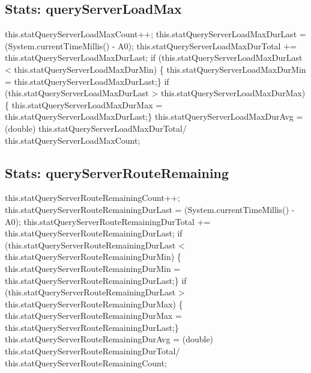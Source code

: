 \subsection{Stats: queryServerLoadMax}
\nwenddocs{}\endmoddef{}
    this.statQueryServerLoadMaxCount++;
    this.statQueryServerLoadMaxDurLast = (System.currentTimeMillis() - A0);
    this.statQueryServerLoadMaxDurTotal +=
    this.statQueryServerLoadMaxDurLast;
if (this.statQueryServerLoadMaxDurLast <
    this.statQueryServerLoadMaxDurMin) \{
    this.statQueryServerLoadMaxDurMin =
    this.statQueryServerLoadMaxDurLast;\}
if (this.statQueryServerLoadMaxDurLast >
    this.statQueryServerLoadMaxDurMax) \{
    this.statQueryServerLoadMaxDurMax =
    this.statQueryServerLoadMaxDurLast;\}
    this.statQueryServerLoadMaxDurAvg = (double)
    this.statQueryServerLoadMaxDurTotal/
    this.statQueryServerLoadMaxCount;
\nwendcode{}\nwdocspar

\subsection{Stats: queryServerRouteRemaining}
\nwenddocs{}\endmoddef{}
    this.statQueryServerRouteRemainingCount++;
    this.statQueryServerRouteRemainingDurLast = (System.currentTimeMillis() - A0);
    this.statQueryServerRouteRemainingDurTotal +=
    this.statQueryServerRouteRemainingDurLast;
if (this.statQueryServerRouteRemainingDurLast <
    this.statQueryServerRouteRemainingDurMin) \{
    this.statQueryServerRouteRemainingDurMin =
    this.statQueryServerRouteRemainingDurLast;\}
if (this.statQueryServerRouteRemainingDurLast >
    this.statQueryServerRouteRemainingDurMax) \{
    this.statQueryServerRouteRemainingDurMax =
    this.statQueryServerRouteRemainingDurLast;\}
    this.statQueryServerRouteRemainingDurAvg = (double)
    this.statQueryServerRouteRemainingDurTotal/
    this.statQueryServerRouteRemainingCount;
\nwendcode{}\nwdocspar

